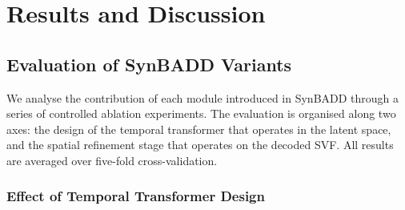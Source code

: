 \section{Results and Discussion}

\subsection{Evaluation of SynBADD Variants}
\label{sec:ablation}

We analyse the contribution of each module introduced in SynBADD through a series of controlled ablation experiments. The evaluation is organised along two axes: the design of the temporal transformer that operates in the latent space, and the spatial refinement stage that operates on the decoded SVF. All results are averaged over five-fold cross-validation.


\subsubsection{Effect of Temporal Transformer Design}



